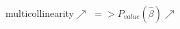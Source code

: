 \documentclass[preview, border=1pt, convert={outext=.png}]{standalone}
\begin{document}
multicollinearity$\nearrow$  $=> P_{value}(\hat{\beta}) \nearrow$
\end{document}
